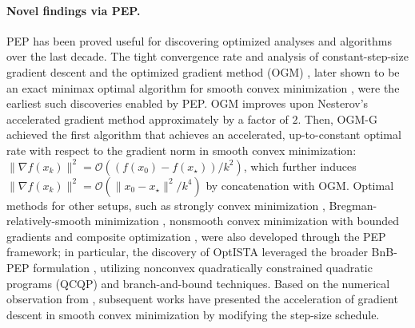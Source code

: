 \documentclass{article}
\theoremstyle{definition}
\theoremstyle{plain}
\newcommand{\pr}[1]{\left( #1 \right)}
\begin{document}
\paragraph{Novel findings via PEP.}
PEP has been proved useful for discovering optimized analyses and algorithms over the last decade.
The tight convergence rate and analysis of constant-step-size gradient descent \cite{DroriTeboulle2014_performance}
and the optimized gradient method (OGM) \cite{DroriTeboulle2014_performance, KimFessler2016_optimized}, later shown to be an exact minimax optimal algorithm for smooth convex minimization \cite{Drori2017_exact}, 
were the earliest such discoveries enabled by PEP.
OGM improves upon Nesterov's accelerated gradient method \cite{Nesterov1983_method} approximately by a factor of $2$. 
Then, OGM-G \cite{KimFessler2021_optimizing} achieved the first 
algorithm that achieves an accelerated, up-to-constant optimal rate with respect to the gradient norm in smooth convex minimization: $\| \nabla f(x_k) \|^2 = \mathcal{O}\pr{ (f(x_0) - f(x_\star)) / k^2 }$, which further induces $\| \nabla f(x_k) \|^2 = \mathcal{O}\pr{ \| x_0 - x_\star \|^2 / k^4 }$ by concatenation with OGM. 
Optimal methods for other setups, such as strongly convex minimization \citep[ITEM]{TaylorDrori2023_optimal}, Bregman-relatively-smooth minimization \cite{dragomirOptimalComplexityCertification2022}, nonsmooth convex minimization with bounded gradients \cite{DroriTaylor2020_efficient} and composite optimization \citep[OptISTA]{JangGuptaRyu2025_computerassisted}, were also developed through the PEP framework; 
in particular, the discovery of OptISTA leveraged the broader BnB-PEP formulation \cite{DasGuptaVanParysRyu2023_branchandbound}, utilizing nonconvex quadratically constrained quadratic programs (QCQP) and branch-and-bound techniques. 
Based on the numerical observation from \cite{DasGuptaVanParysRyu2023_branchandbound}, subsequent works \cite{grimmerProvablyFasterGradient2024, altschulerAccelerationStepsizeHedging2025, altschulerAccelerationStepsizeHedging2025a, grimmerAcceleratedObjectiveGap2025} have presented the acceleration of gradient descent in smooth convex minimization by modifying the step-size schedule.
\end{document}
